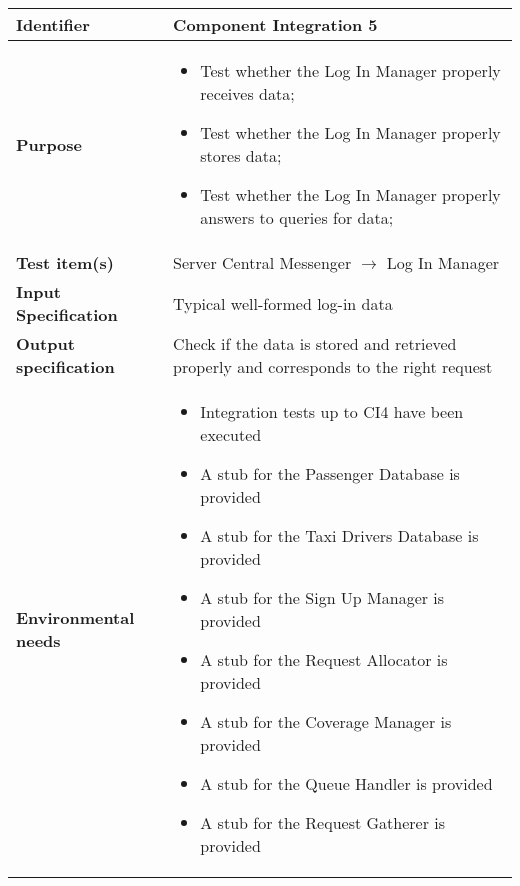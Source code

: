 
\begin{center}
\begin{tabular}{lp{}}
\toprule
\textbf{Identifier}		&	Component Integration 5\\
\midrule
\textbf{Purpose}		&	\begin{itemize}
					\item Test whether the Log In Manager properly receives data;
					\item Test whether the Log In Manager properly stores data;
					\item Test whether the Log In Manager properly answers to queries for data;
					\end{itemize}	\\
\textbf{Test item(s)}	&	Server Central Messenger $\rightarrow$ Log In Manager\\
\textbf{Input Specification}	&	Typical well-formed log-in data\\
\textbf{Output specification}	&	Check if the data is stored and retrieved properly and corresponds to the right request\\
\textbf{Environmental needs}	&	\begin{itemize}
							\item Integration tests up to CI4 have been executed
							\item A stub for the Passenger Database is provided
							\item A stub for the Taxi Drivers Database is provided
							\item A stub for the Sign Up Manager is provided												\item A stub for the Request Allocator is provided
							\item A stub for the Coverage Manager is provided
							\item A stub for the Queue Handler is provided
							\item A stub for the Request Gatherer is provided
							\end{itemize}	\\
\bottomrule
\end{tabular}
\end{center}



